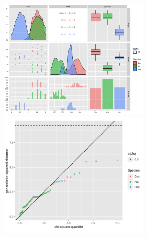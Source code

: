 \begin{center}
	\includegraphics[width=3.0in]{1_scattermatrix.png}
	\includegraphics[width=3.0in]{1_chisq.png}
\end{center}

